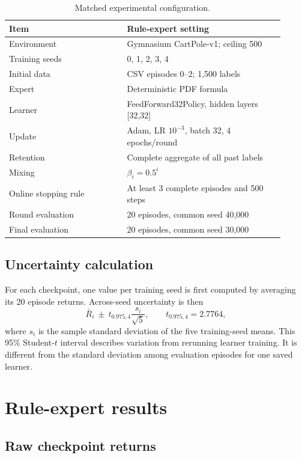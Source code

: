 \documentclass[11pt]{article}
\begin{document}
\begin{table}[ht]
\centering
\caption{Matched experimental configuration.}
\small
\begin{tabular}{@{}p{0.39\linewidth}p{0.52\linewidth}@{}}
\toprule
Item & Rule-expert setting \\
\midrule
Environment & Gymnasium CartPole-v1; ceiling 500 \\
Training seeds & 0, 1, 2, 3, 4 \\
Initial data & CSV episodes 0--2; 1,500 labels \\
Expert & Deterministic PDF formula \\
Learner & FeedForward32Policy, hidden layers [32,32] \\
Update & Adam, LR $10^{-3}$, batch 32, 4 epochs/round \\
Retention & Complete aggregate of all past labels \\
Mixing & $\beta_i=0.5^i$ \\
Online stopping rule & At least 3 complete episodes and 500 steps \\
Round evaluation & 20 episodes, common seed 40,000 \\
Final evaluation & 20 episodes, common seed 30,000 \\
\bottomrule
\end{tabular}
\end{table}

\subsection{Uncertainty calculation}

For each checkpoint, one value per training seed is first computed by averaging its 20 episode returns. Across-seed uncertainty is then
\[
\bar R_i\ \pm\ t_{0.975,4}\frac{s_i}{\sqrt{5}},
\qquad t_{0.975,4}=2.7764,
\]
where $s_i$ is the sample standard deviation of the five training-seed means. This 95\% Student-$t$ interval describes variation from rerunning learner training. It is different from the standard deviation among evaluation episodes for one saved learner.

\section{Rule-expert results}

\subsection{Raw checkpoint returns}
\end{document}
